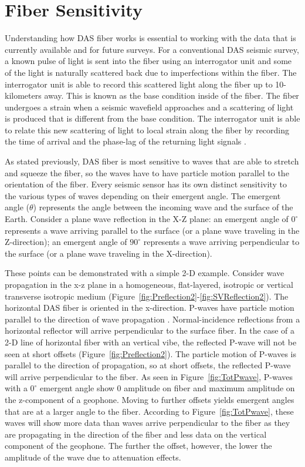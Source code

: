 \section{Fiber Sensitivity}
Understanding how DAS fiber works is essential to working with the data that is currently available and for future surveys. For a conventional DAS seismic survey, a known pulse of light is sent into the fiber using an interrogator unit and some of the light is naturally scattered back due to imperfections within the fiber. The interrogator unit is able to record this scattered light along the fiber up to 10-kilometers away. This is known as the base condition inside of the fiber. The fiber undergoes a strain when a seismic wavefield approaches and a scattering of light is produced that is different from the base condition. The interrogator unit is able to relate this new scattering of light to local strain along the fiber by recording the time of arrival and the phase-lag of the returning light signals \citep{Parker2014}.

As stated previously, DAS fiber is most sensitive to waves that are able to stretch and squeeze the fiber, so the waves have to have particle motion parallel to the orientation of the fiber. Every seismic sensor has its own distinct sensitivity to the various types of waves depending on their emergent angle. The emergent angle ($\theta$) represents the angle between the incoming wave and the surface of the Earth. Consider a plane wave reflection in the X-Z plane: an emergent angle of $0^{\circ}$ represents a wave arriving parallel to the surface (or a plane wave traveling in the Z-direction); an emergent angle of $90^{\circ}$ represents a wave arriving perpendicular to the surface (or a plane wave traveling in the X-direction).

These points can be demonstrated with a simple 2-D example. Consider wave propagation in the x-z plane in a homogeneous, flat-layered, isotropic or vertical transverse isotropic medium (Figure~\ref{fig:Preflection2}-\ref{fig:SVReflection2}). The horizontal DAS fiber is oriented in the x-direction. P-waves have particle motion parallel to the direction of wave propagation \citep{aki1980quantative}. Normal-incidence reflections from a horizontal reflector will arrive perpendicular to the surface fiber.  In the case of a 2-D line of horizontal fiber with an vertical vibe, the reflected P-wave will not be seen at short offsets (Figure~\ref{fig:Preflection2}). The particle motion of P-waves is parallel to the direction of propagation, so at short offsets, the reflected P-wave will arrive perpendicular to the fiber. As seen in Figure~\ref{fig:TotPwave}, P-waves with a $0^{\circ}$ emergent angle show 0 amplitude on fiber and maximum amplitude on the z-component of a geophone. Moving to further offsets yields emergent angles that are at a larger angle to the fiber. According to Figure~\ref{fig:TotPwave}, these waves will show more data than waves arrive perpendicular to the fiber as they are propagating in the direction of the fiber and less data on the vertical component of the geophone. The further the offset, however, the lower the amplitude of the wave due to attenuation effects.

